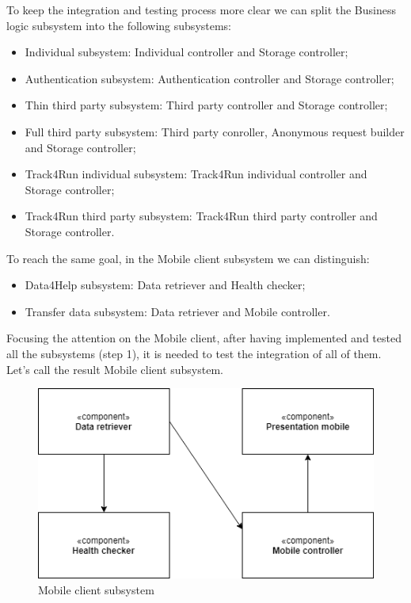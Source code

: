 To keep the integration and testing process more clear we can split the Business logic subsystem into the following subsystems:
	\begin{itemize}
	\item Individual subsystem: Individual controller and Storage controller;
	\item Authentication subsystem: Authentication controller and Storage controller;
	\item Thin third party subsystem: Third party controller and Storage controller;
	\item Full third party subsystem: Third party conroller, Anonymous request builder and Storage controller;
	\item Track4Run individual subsystem: Track4Run individual controller and Storage controller;
	\item Track4Run third party subsystem: Track4Run third party controller and Storage controller.\\
	\end{itemize}

To reach the same goal, in the Mobile client subsystem we can distinguish:
	\begin{itemize}
	\item Data4Help subsystem: Data retriever and Health checker;
	\item Transfer data subsystem: Data retriever and Mobile controller.\\
	\end{itemize}

Focusing the attention on the Mobile client, after having implemented and tested all the subsystems (step 1), it is needed to test the integration of all of them. Let's call the result Mobile client subsystem.
	\begin{figure}[H]
	\centering
	\includegraphics[scale=0.5] {images/integration/mobileClient.png}
	\caption {Mobile client subsystem}
	\end{figure}
	
